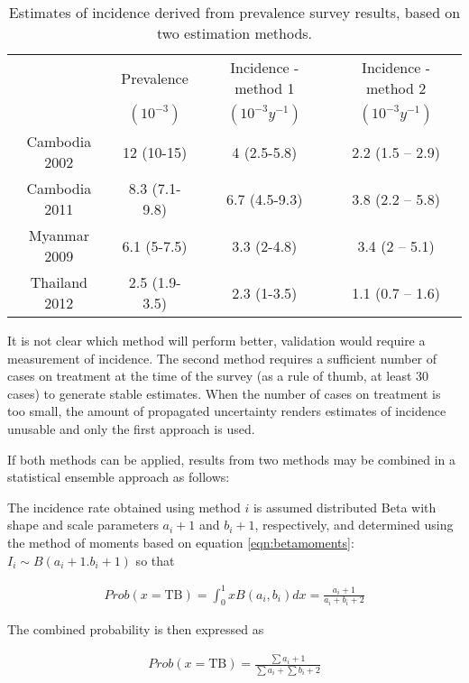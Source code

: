 \begin{table} 
    \begin{tabular}{ c c c c }
    \hline
         & Prevalence & Incidence - method 1 & Incidence - method 2 \\ 
         & $(10^{-3})$  & $(10^{-3} y^{-1})$     & $(10^{-3} y^{-1})$ \\
    \hline
        Cambodia 2002 & 12 (10-15) & 4 (2.5-5.8) & 2.2 (1.5 – 2.9) \\ 
        Cambodia 2011 & 8.3 (7.1-9.8) & 6.7 (4.5-9.3) & 3.8 (2.2 – 5.8) \\ 
        Myanmar 2009 & 6.1 (5-7.5) & 3.3 (2-4.8) & 3.4 (2 – 5.1) \\ 
        Thailand 2012 & 2.5 (1.9-3.5) & 2.3 (1-3.5) & 1.1 (0.7 – 1.6) \\ 
    \hline
    \end{tabular} 
    \caption{Estimates of incidence derived from prevalence survey results, based on two estimation methods.} 
    \label{tab:2methods}
\end{table}

It is not clear which method will perform better, validation would require a measurement of incidence. The second method requires a sufficient number of cases on treatment at the time of the survey (as a rule of thumb, at least 30 cases) to generate stable estimates. When the number of cases on treatment is too small, the amount of propagated uncertainty renders estimates of incidence unusable and only the first approach is used. 

If both methods can be applied, results from two methods may be combined in a statistical ensemble approach as follows:

The incidence rate obtained using method $i$ is assumed distributed Beta with shape and scale parameters $a_i + 1$ and $b_i + 1$, respectively, and determined using the method of moments based on equation \ref{eqn:betamoments}: $I_i \sim B(a_i + 1. b_i + 1)$ so that 

\begin{align*}
Prob(x = \textrm{TB})= \int_{0}^{1} x B(a_i,b_i) dx = \frac{a_i+1}{a_i+b_i+2}
\end{align*}

The combined probability is then expressed as 

\begin{align*}
Prob(x = \textrm{TB}) = \frac{\sum{a_i}+1}{\sum{a_i}+\sum{b_i}+2} 
\end{align*}




